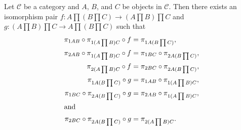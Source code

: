 \documentclass[../../math.tex]{subfiles}
\begin{document}
\begin{theorem} \label{product_assoc}
    Let $\mathcal C$ be a category and $A$, $B$, and $C$ be objects in $\mathcal
    C$.  Then there exists an isomorphism pair $f : A \prod (B \prod C) \to (A
    \prod B) \prod C$ and $g : (A \prod B) \prod C \to A \prod (B \prod C)$ such
    that
    \begin{align*}
        \pi_{1AB} \circ \pi_{1(A \prod B) C} \circ f &= \pi_{1A(B \prod C)}, \\
        \pi_{2AB} \circ \pi_{1(A \prod B) C} \circ f
            &= \pi_{1BC} \circ \pi_{2A(B \prod C)}, \\
        \pi_{2(A \prod B) C} \circ f &= \pi_{2BC} \circ \pi_{2A(B \prod C)}, \\
        \pi_{1A(B \prod C)} \circ g &= \pi_{1AB} \circ \pi_{1(A \prod B) C}, \\
        \pi_{1BC} \circ \pi_{2A(B \prod C)} \circ g
            &= \pi_{2AB} \circ \pi_{1(A \prod B) C}, \\
    \intertext{and}
        \pi_{2BC} \circ \pi_{2A(B \prod C)} \circ g &= \pi_{2(A \prod B) C}.
    \end{align*}
\end{theorem}
\end{document}
